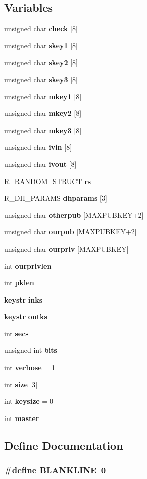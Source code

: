 \subsection*{Variables}
\begin{CompactItemize}
\item 
unsigned char {\bf check} [8]
\item 
unsigned char {\bf skey1} [8]
\item 
unsigned char {\bf skey2} [8]
\item 
unsigned char {\bf skey3} [8]
\item 
unsigned char {\bf mkey1} [8]
\item 
unsigned char {\bf mkey2} [8]
\item 
unsigned char {\bf mkey3} [8]
\item 
unsigned char {\bf ivin} [8]
\item 
unsigned char {\bf ivout} [8]
\item 
R\_\-RANDOM\_\-STRUCT {\bf rs}
\item 
R\_\-DH\_\-PARAMS {\bf dhparams} [3]
\item 
unsigned char {\bf otherpub} [MAXPUBKEY+2]
\item 
unsigned char {\bf ourpub} [MAXPUBKEY+2]
\item 
unsigned char {\bf ourpriv} [MAXPUBKEY]
\item 
int {\bf ourprivlen}
\item 
int {\bf pklen}
\item 
{\bf keystr} {\bf inks}
\item 
{\bf keystr} {\bf outks}
\item 
int {\bf secs}
\item 
unsigned int {\bf bits}
\item 
int {\bf verbose} = 1
\item 
int {\bf size} [3]
\item 
int {\bf keysize} = 0
\item 
int {\bf master}
\end{CompactItemize}


\subsection{Define Documentation}
\subsubsection{\setlength{\rightskip}{0pt plus 5cm}\#define BLANKLINE\ 0}\label{esm__cipher_8c_a0}




